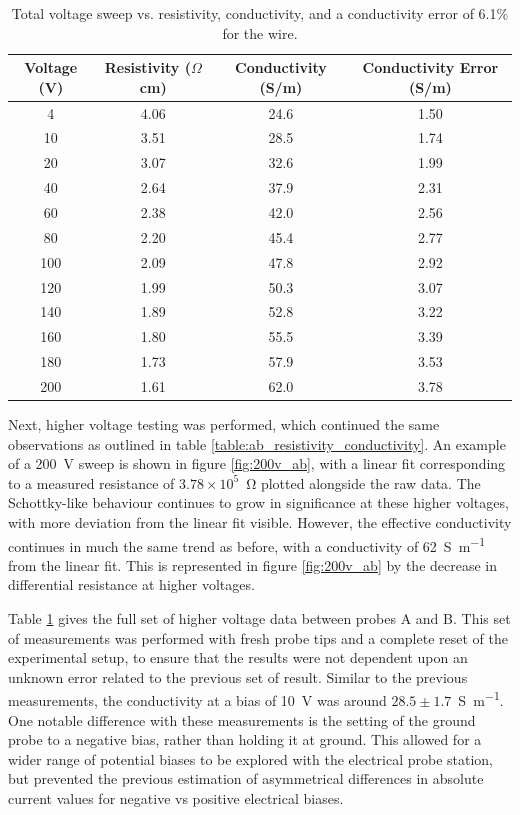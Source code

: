 \begin{refsection}
\begin{table}[ht]
\centering
\begin{tabular}{|c|c|c|c|}
\hline
Voltage (V) & Resistivity ($\Omega$cm) & Conductivity (S/m) & Conductivity Error (S/m) \\
\hline
4 & 4.06 & 24.6 & 1.50 \\
10 & 3.51 & 28.5 & 1.74 \\
20 & 3.07 & 32.6 & 1.99 \\
40 & 2.64 & 37.9 & 2.31 \\
60 & 2.38 & 42.0 & 2.56 \\
80 & 2.20 & 45.4 & 2.77 \\
100 & 2.09 & 47.8 & 2.92 \\
120 & 1.99 & 50.3 & 3.07 \\
140 & 1.89 & 52.8 & 3.22 \\
160 & 1.80 & 55.5 & 3.39 \\
180 & 1.73 & 57.9 & 3.53 \\
200 & 1.61 & 62.0 & 3.78 \\
\hline
\end{tabular}
\caption{Total voltage sweep vs. resistivity, conductivity, and a conductivity error of 6.1\% for the wire.}
\label{table:total_sweep_resistivity_conductivity}
\end{table}

Next, higher voltage testing was performed, which continued the same observations as outlined in table \ref{table:ab_resistivity_conductivity}. An example of a 200~\si{\volt} sweep is shown in figure \ref{fig:200v_ab}, with a linear fit corresponding to a measured resistance of $3.78\times10^{5}$~\si{\ohm} plotted alongside the raw data. The Schottky-like behaviour continues to grow in significance at these higher voltages, with more deviation from the linear fit visible. However, the effective conductivity continues in much the same trend as before, with a conductivity of 62~\si{\siemens\per\metre} from the linear fit. This is represented in figure \ref{fig:200v_ab} by the decrease in differential resistance at higher voltages.

Table \ref{table:total_sweep_resistivity_conductivity} gives the full set of higher voltage data between probes A and B. This set of measurements was performed with fresh probe tips and a complete reset of the experimental setup, to ensure that the results were not dependent upon an unknown error related to the previous set of result. Similar to the previous measurements, the conductivity at a bias of 10~\si{\volt} was around $28.5\pm1.7$~\si{\siemens\per\metre}. One notable difference with these measurements is the setting of the ground probe to a negative bias, rather than holding it at ground. This allowed for a wider range of potential biases to be explored with the electrical probe station, but prevented the previous estimation of asymmetrical differences in absolute current values for negative vs positive electrical biases.


\end{refsection}

